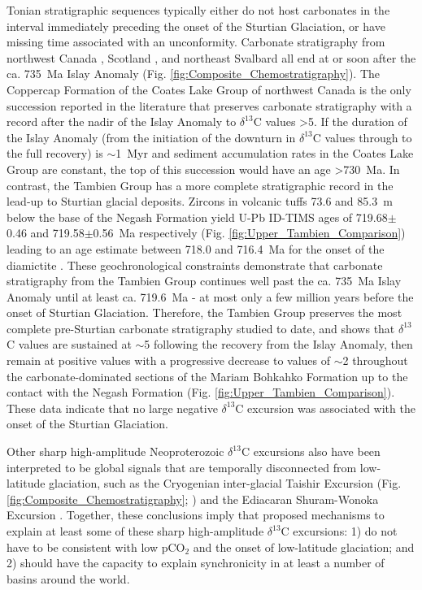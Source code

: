 \documentclass[11pt,letterpaper]{article}
\newcommand{\dC}{$\delta^{13}$C\xspace}
\newcommand{\permil}{\textperthousand\xspace}
\begin{document}
Tonian stratigraphic sequences typically either do not host carbonates in the interval immediately preceding the onset of the Sturtian Glaciation, or have missing time associated with an unconformity. Carbonate stratigraphy from northwest Canada \citep{Halverson2006a, Macdonald2010a, Rooney2014a}, Scotland \citep{Sawaki2010a}, and northeast Svalbard \citep{Halverson2007a} all end at or soon after the ca. 735~Ma Islay Anomaly (Fig. \ref{fig:Composite_Chemostratigraphy}). The Coppercap Formation of the Coates Lake Group of northwest Canada is the only succession reported in the literature that preserves carbonate stratigraphy with a record after the nadir of the Islay Anomaly to \dC values \textgreater5\permil \citep{Halverson2006a, Rooney2014a}. If the duration of the Islay Anomaly (from the initiation of the downturn in \dC values through to the full recovery) is $\sim$1~Myr \citep{MacLennan2018a} and sediment accumulation rates in the Coates Lake Group are constant, the top of this succession would have an age \textgreater730~Ma. In contrast, the Tambien Group has a more complete stratigraphic record in the lead-up to Sturtian glacial deposits. Zircons in volcanic tuffs 73.6 and 85.3~m below the base of the Negash Formation yield U-Pb ID-TIMS ages of 719.68$\pm$0.46 and 719.58$\pm$0.56~Ma respectively (Fig. \ref{fig:Upper_Tambien_Comparison}) leading to an age estimate between 718.0 and 716.4~Ma for the onset of the diamictite \citep{MacLennan2018a}. These geochronological constraints demonstrate that carbonate stratigraphy from the Tambien Group continues well past the ca. 735~Ma Islay Anomaly until at least ca. 719.6~Ma - at most only a few million years before the onset of Sturtian Glaciation. Therefore, the Tambien Group preserves the most complete pre-Sturtian carbonate stratigraphy studied to date, and shows that \dC values are sustained at $\sim$5\permil following the recovery from the Islay Anomaly, then remain at positive values with a progressive decrease to values of $\sim$2\permil throughout the carbonate-dominated sections of the Mariam Bohkahko Formation up to the contact with the Negash Formation (Fig. \ref{fig:Upper_Tambien_Comparison}). These data indicate that no large negative \dC excursion was associated with the onset of the Sturtian Glaciation.

Other sharp high-amplitude Neoproterozoic \dC excursions also have been interpreted to be global signals that are temporally disconnected from low-latitude glaciation, such as the Cryogenian inter-glacial Taishir Excursion (Fig. \ref{fig:Composite_Chemostratigraphy}; \citealp{Bold2016a}) and the Ediacaran Shuram-Wonoka Excursion \citep{Husson2015a}. Together, these conclusions imply that proposed mechanisms to explain at least some of these sharp high-amplitude \dC excursions: 1) do not have to be consistent with low pCO$_{2}$ and the onset of low-latitude glaciation; and 2) should have the capacity to explain synchronicity in at least a number of basins around the world.
\end{document}
